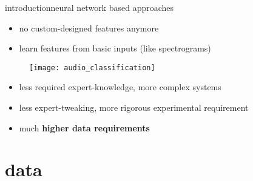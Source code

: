         \begin{frame}{introduction}{neural network based approaches}
            
            \begin{itemize}
                \item   no custom-designed features anymore
                \item   learn features from basic inputs (like spectrograms)
            \end{itemize}
            \begin{figure}%
                \texttt{[image: audio\_classification]}%
            \end{figure}
            \pause
            \begin{itemize}
                \item   less required expert-knowledge, more complex systems
                \item   less expert-tweaking, more rigorous experimental requirement
                \item   much \textcolor{gtgold}{\textbf{higher data requirements}}
            \end{itemize}
            
            {}
        \end{frame}
        
    \section{data}
        
        
